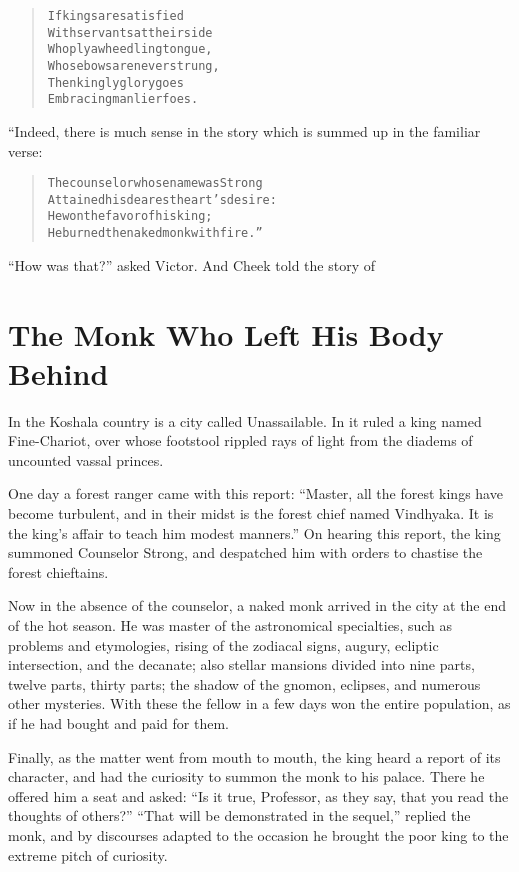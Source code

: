 \documentclass[article, twoside, 14pt]{memoir}
\renewenvironment{verbatim}{%
\begin{quote}%
\vskip -10pt%
\begin{alltt}\normalfont\large}{\end{alltt}%
\end{quote}%
\vskip -10pt
} %
\begin{document}
\begin{verbatim}
If kings are satisfied
With servants at their side
Who ply a wheedling tongue,
Whose bows are never strung,
Then kingly glory goes
Embracing manlier foes.
\end{verbatim}
“Indeed, there is much sense in the story which is summed up in the
familiar verse:

\begin{verbatim}
The counselor whose name was Strong
    Attained his dearest heart's desire:
He won the favor of his king;
    He burned the naked monk with fire.”
\end{verbatim}
``How was that?'' asked Victor. And Cheek told the story of

\chapter{The Monk Who Left His Body Behind}

\label{s25}

In the Koshala country is a city called Unassailable. In it ruled a
king named Fine-Chariot, over whose footstool rippled rays of light
from the diadems of uncounted vassal princes.

One day a forest ranger came with this report:
``Master, all the forest kings have become turbulent, and in their midst is the forest chief named Vindhyaka. It is the king's affair to teach him modest manners.''
On hearing this report, the king summoned Counselor Strong, and
despatched him with orders to chastise the forest chieftains.

Now in the absence of the counselor, a naked monk arrived in the
city at the end of the hot season. He was master of the
astronomical specialties, such as problems and etymologies, rising
of the zodiacal signs, augury, ecliptic intersection, and the
decanate; also stellar mansions divided into nine parts, twelve
parts, thirty parts; the shadow of the gnomon, eclipses, and
numerous other mysteries. With these the fellow in a few days won
the entire population, as if he had bought and paid for them.

Finally, as the matter went from mouth to mouth, the king heard a
report of its character, and had the curiosity to summon the monk
to his palace. There he offered him a seat and asked:
``Is it true, Professor, as they say, that you read the thoughts of others?''
``That will be demonstrated in the sequel,'' replied the monk, and
by discourses adapted to the occasion he brought the poor king to
the extreme pitch of curiosity.
\end{document}
